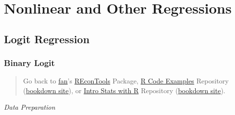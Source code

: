 \documentclass[
]{book}
\begin{document}
\hypertarget{nonlinear-and-other-regressions}{%
\chapter{Nonlinear and Other Regressions}\label{nonlinear-and-other-regressions}}

\hypertarget{logit-regression}{%
\section{Logit Regression}\label{logit-regression}}

\hypertarget{binary-logit}{%
\subsection{Binary Logit}\label{binary-logit}}

\begin{quote}
Go back to \href{http://fanwangecon.github.io/}{fan}'s \href{https://fanwangecon.github.io/REconTools/}{REconTools} Package, \href{https://fanwangecon.github.io/R4Econ/}{R Code Examples} Repository (\href{https://fanwangecon.github.io/R4Econ/bookdown}{bookdown site}), or \href{https://fanwangecon.github.io/Stat4Econ/}{Intro Stats with R} Repository (\href{https://fanwangecon.github.io/Stat4Econ/bookdown}{bookdown site}).
\end{quote}

\emph{Data Preparation}
\end{document}
